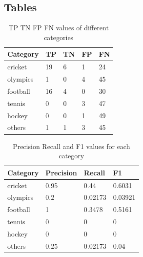 \documentclass[12pt]{article}
\begin{document}
\subsection{Tables}


\begin{center}
\begin{table}
\begin{tabular}{ |p{3.0cm}|p{3.0cm}| p{3.0cm} | p{3.0cm} |p{3.0cm}| }\hline
\textbf{Category} & \textbf{TP} & \textbf{TN} & \textbf{FP} & \textbf{FN} \\\hline
cricket & 19 & 6 & 1 & 24 \\\hline			
olympics & 1 & 0 & 4 & 45 \\\hline			
football & 16 & 4 & 0 & 30	\\\hline		
tennis  & 0 & 0 & 3 & 47 \\\hline			
hockey  & 0 & 0 & 1 & 49 \\\hline			
others & 1 & 1 & 3 & 45	\\\hline		




\end{tabular}
\caption{TP TN FP FN values of different categories}
\end{table}
\end{center}

\newpage

\begin{center}
\begin{table}
\small
\begin{tabular}{ | p{3.0cm} | p{2.0cm} |p{2.0cm} | p{2.0cm} | }\hline
\textbf{Category} & \textbf{Precision} & \textbf{Recall} & \textbf{F1} \\\hline
cricket & 0.95  &  0.44  & 0.6031 \\\hline			
olympics & 0.2  &  0.02173  & 0.03921 \\\hline			
football & 1  &  0.3478  & 0.5161 \\\hline			
tennis  & 0  &  0  & 0	\\\hline		
hockey  & 0  &  0  & 0	\\\hline		
others & 0.25  &  0.02173  & 0.04 \\\hline			

\end{tabular}
\caption{Precision Recall and F1 values for each category}
\end{table}
\end{center}


\newpage













\cite{*}
\end{document}
